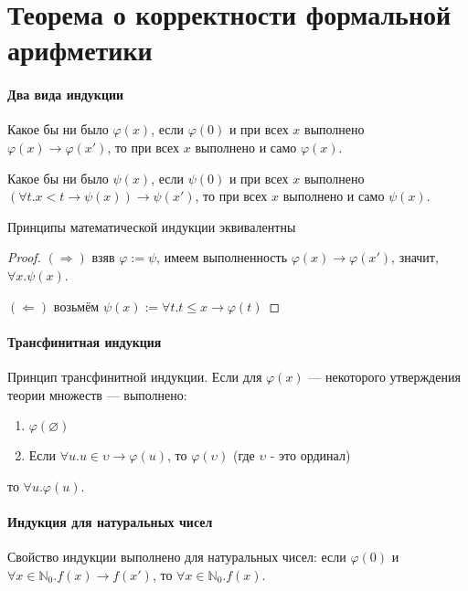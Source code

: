 \section{Теорема о корректности формальной арифметики}


\paragraph{Два вида индукции}
\begin{definition}
Какое бы ни было $\varphi(x)$, если $\varphi(0)$ и при всех $x$ выполнено $\varphi(x)\rightarrow \varphi(x')$, то
при всех $x$ выполнено и само $\varphi(x)$.
\end{definition}

\begin{definition}
Какое бы ни было $\psi(x)$, если $\psi(0)$ и при всех $x$ выполнено $(\forall t.x < t \rightarrow \psi(x))\rightarrow \psi(x')$, то
при всех $x$ выполнено и само $\psi(x)$.
\end{definition}

\begin{theorem}
  Принципы математической индукции эквивалентны
\end{theorem}
\begin{proof}
$(\Rightarrow)$ взяв $\varphi := \psi$, имеем выполненность $\varphi(x)\rightarrow\varphi(x')$, значит, $\forall x.\psi(x)$.

$(\Leftarrow)$ возьмём $\psi(x) := \forall t.t\le x\rightarrow\varphi(t)$
\end{proof}


\paragraph{Трансфинитная индукция}
\begin{theorem}Принцип трансфинитной индукции. Если для $\varphi(x)$ --- некоторого утверждения
теории множеств --- выполнено:
\begin{enumerate}
\item $\varphi(\varnothing)$
\item Если $\forall u.u \in \upsilon \rightarrow \varphi(u)$, то $\varphi(\upsilon)$ (где $\upsilon$ - это ординал)
\end{enumerate}
то $\forall u.\varphi(u)$.
\end{theorem}


\paragraph{Индукция для натуральных чисел}
\begin{lemma}Свойство индукции выполнено для натуральных чисел:
если $\varphi(0)$ и $\forall x\in\mathbb{N}_0.f(x) \rightarrow f(x')$, то $\forall x\in\mathbb{N}_0.f(x)$.
\end{lemma}

